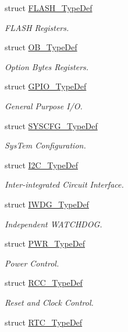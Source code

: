 \begin{DoxyCompactItemize}
struct \hyperlink{struct_f_l_a_s_h___type_def}{F\+L\+A\+S\+H\+\_\+\+Type\+Def}
\begin{DoxyCompactList}\small\item\em F\+L\+A\+SH Registers. \end{DoxyCompactList}\item 
struct \hyperlink{struct_o_b___type_def}{O\+B\+\_\+\+Type\+Def}
\begin{DoxyCompactList}\small\item\em Option Bytes Registers. \end{DoxyCompactList}\item 
struct \hyperlink{struct_g_p_i_o___type_def}{G\+P\+I\+O\+\_\+\+Type\+Def}
\begin{DoxyCompactList}\small\item\em General Purpose I/O. \end{DoxyCompactList}\item 
struct \hyperlink{struct_s_y_s_c_f_g___type_def}{S\+Y\+S\+C\+F\+G\+\_\+\+Type\+Def}
\begin{DoxyCompactList}\small\item\em Sys\+Tem Configuration. \end{DoxyCompactList}\item 
struct \hyperlink{struct_i2_c___type_def}{I2\+C\+\_\+\+Type\+Def}
\begin{DoxyCompactList}\small\item\em Inter-\/integrated Circuit Interface. \end{DoxyCompactList}\item 
struct \hyperlink{struct_i_w_d_g___type_def}{I\+W\+D\+G\+\_\+\+Type\+Def}
\begin{DoxyCompactList}\small\item\em Independent W\+A\+T\+C\+H\+D\+OG. \end{DoxyCompactList}\item 
struct \hyperlink{struct_p_w_r___type_def}{P\+W\+R\+\_\+\+Type\+Def}
\begin{DoxyCompactList}\small\item\em Power Control. \end{DoxyCompactList}\item 
struct \hyperlink{struct_r_c_c___type_def}{R\+C\+C\+\_\+\+Type\+Def}
\begin{DoxyCompactList}\small\item\em Reset and Clock Control. \end{DoxyCompactList}\item 
struct \hyperlink{struct_r_t_c___type_def}{R\+T\+C\+\_\+\+Type\+Def}

\end{DoxyCompactItemize}

